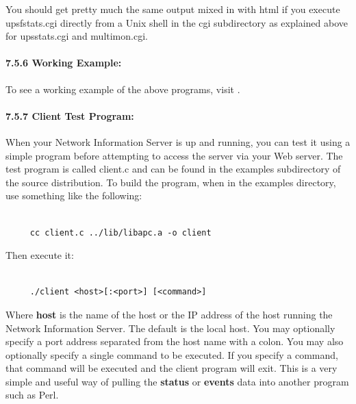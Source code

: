 You should get pretty much the same output mixed in with html if you execute
upsfstats.cgi directly from a Unix shell in the cgi subdirectory as explained
above for upsstats.cgi and multimon.cgi. 

\label{Working-Example}

\paragraph*{7.5.6 Working Example:}

\label{index-CGI_002c-working-example-134}
\label{index-Example_002c-CGI-135}
To see a working example of the above programs, visit 
. 

\label{Client-Test-Program}

\paragraph*{7.5.7 Client Test Program:}

\label{index-Client-Test-program-136}
When your Network Information Server is up and running, you can test it using
a simple program before attempting to access the server via your Web server.
The test program is called client.c and can be found in the examples
subdirectory of the source distribution. To build the program, when in the
examples directory, use something like the following: 

\footnotesize
\begin{verbatim}
     
     cc client.c ../lib/libapc.a -o client
\end{verbatim}
\normalsize

Then execute it: 

\footnotesize
\begin{verbatim}
     
     ./client <host>[:<port>] [<command>]
\end{verbatim}
\normalsize

Where {\bf host} is the name of the host or the IP address of the host running
the Network Information Server. The default is the local host. You may
optionally specify a port address separated from the host name with a colon.
You may also optionally specify a single command to be executed. If you
specify a command, that command will be executed and the client program will
exit. This is a very simple and useful way of pulling the {\bf status} or {\bf
events} data into another program such as Perl.  

